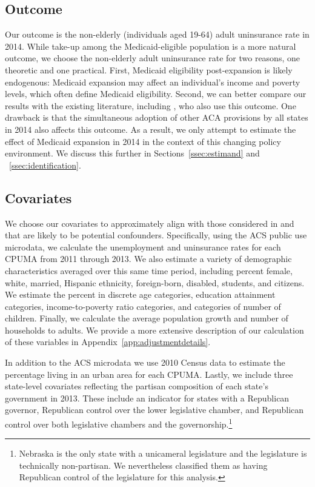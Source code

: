\documentclass[aoas]{imsart}
\theoremstyle{plain}
\theoremstyle{remark}
\begin{document}
\subsection{Outcome}

Our outcome is the non-elderly (individuals aged 19-64) adult uninsurance rate in 2014. While take-up among the Medicaid-eligible population is a more natural outcome, we choose the non-elderly adult uninsurance rate for two reasons, one theoretic and one practical. First, Medicaid eligibility post-expansion is likely endogenous: Medicaid expansion may affect an individual's income and poverty levels, which often define Medicaid eligibility. Second, we can better compare our results with the existing literature, including \cite{courtemanche2017early}, who also use this outcome. One drawback is that the simultaneous adoption of other ACA provisions by all states in 2014 also affects this outcome. As a result, we only attempt to estimate the effect of Medicaid expansion in 2014 in the context of this changing policy environment. We discuss this further in Sections~\ref{ssec:estimand} and ~\ref{ssec:identification}. 

\subsection{Covariates}

We choose our covariates to approximately align with those considered in \cite{courtemanche2017early} and that are likely to be potential confounders. Specifically, using the ACS public use microdata, we calculate the unemployment and uninsurance rates for each CPUMA from 2011 through 2013. We also estimate a variety of demographic characteristics averaged over this same time period, including percent female, white, married, Hispanic ethnicity, foreign-born, disabled, students, and citizens. We estimate the percent in discrete age categories, education attainment categories, income-to-poverty ratio categories, and categories of number of children. Finally, we calculate the average population growth and number of households to adults. We provide a more extensive description of our calculation of these variables in Appendix~\ref{app:adjustmentdetails}.

In addition to the ACS microdata we use 2010 Census data to estimate the percentage living in an urban area for each CPUMA. Lastly, we include three state-level covariates reflecting the partisan composition of each state's government in 2013. These include an indicator for states with a Republican governor, Republican control over the lower legislative chamber, and Republican control over both legislative chambers and the governorship.\footnote{Nebraska is the only state with a unicameral legislature and the legislature is technically non-partisan. We nevertheless classified them as having Republican control of the legislature for this analysis.} 
\end{document}

